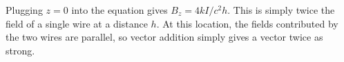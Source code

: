 Plugging $z=0$ into the equation gives $B_z=4kI/c^2h$. This is simply
twice the field of a single wire at a distance $h$. At this location,
the fields contributed by the two wires are parallel, so vector
addition simply gives a vector twice as strong.
